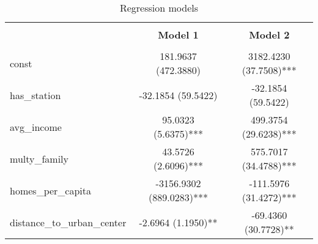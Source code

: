 
    \begin{table}
        \centering
        \caption{Regression models}
        \vspace{10pt}
        \label{tab:regression_models}
        \begin{tabular}{lcc}
        \hline
        \hline \\[-1.8ex]
     & \textbf{Model 1} & \textbf{Model 2} \\
\hline \\[-1.8ex] 
const & 181.9637 (472.3880) & 3182.4230 (37.7508)*** \\
has\_station & -32.1854 (59.5422) & -32.1854 (59.5422) \\
avg\_income & 95.0323 (5.6375)*** & 499.3754 (29.6238)*** \\
multy\_family & 43.5726 (2.6096)*** & 575.7017 (34.4788)*** \\
homes\_per\_capita & -3156.9302 (889.0283)*** & -111.5976 (31.4272)*** \\
distance\_to\_urban\_center & -2.6964 (1.1950)** & -69.4360 (30.7728)** \\

        \hline
        \hline
        \end{tabular}
    \end{table}
    